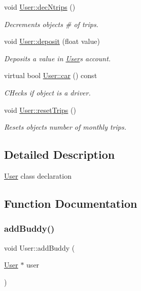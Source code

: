 \begin{DoxyCompactItemize}
\mbox{\label{group___user_ga0b5d245f2e517c697493264e0a1e5642}} 
void \hyperlink{group___user_ga0b5d245f2e517c697493264e0a1e5642}{User\+::dec\+Ntrips} ()
\begin{DoxyCompactList}\small\item\em Decrements object\textquotesingle{}s \# of trips. \end{DoxyCompactList}\item 
void \hyperlink{group___user_gafe73f0b48d4aa29e9205f706a21b7068}{User\+::deposit} (float value)
\begin{DoxyCompactList}\small\item\em Deposits a value in \hyperlink{class_user}{User}\textquotesingle{}s account. \end{DoxyCompactList}\item 
virtual bool \hyperlink{group___user_ga86635e817828c81ee5e18b2e802e3218}{User\+::car} () const
\begin{DoxyCompactList}\small\item\em C\+Hecks if object is a driver. \end{DoxyCompactList}\item 
\mbox{\label{group___user_ga6eb1d321c02d84e4bb839bc49d4ac074}} 
void \hyperlink{group___user_ga6eb1d321c02d84e4bb839bc49d4ac074}{User\+::reset\+Trips} ()
\begin{DoxyCompactList}\small\item\em Resets object\textquotesingle{}s number of monthly trips. \end{DoxyCompactList}\end{DoxyCompactItemize}


\subsection{Detailed Description}
\hyperlink{class_user}{User} class declaration 

\subsection{Function Documentation}
\mbox{\label{group___user_ga72cde56f7a6c5abcf8a22dcd6fdc8449}} 
\subsubsection{\texorpdfstring{add\+Buddy()}{addBuddy()}}
{\footnotesize\ttfamily void User\+::add\+Buddy (\begin{DoxyParamCaption}\item[{\hyperlink{class_user}{User} $\ast$}]{user }\end{DoxyParamCaption})}



